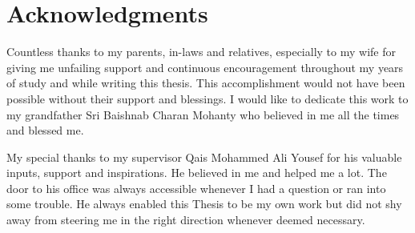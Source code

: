 


\pagestyle{empty}
\begin{abstractpage}

\end{abstractpage}

% 


\section*{Acknowledgments}
Countless thanks to my parents, in-laws and relatives, especially to my wife
for giving me unfailing support and continuous encouragement throughout my 
years of study and while writing this thesis. This accomplishment would not 
have been possible without their support and blessings. I would like to 
dedicate this work to my grandfather Sri Baishnab Charan Mohanty who 
believed in me all the times and blessed me.

\vspace{1em}
\noindent My special thanks to my supervisor Qais Mohammed Ali Yousef for his valuable
inputs, support and inspirations. He believed in me and helped me a lot.
The door to his office was always accessible whenever I had a question 
or ran into some trouble. He always enabled this Thesis to be my own work 
but did not shy away from steering me in the right direction whenever deemed necessary.

